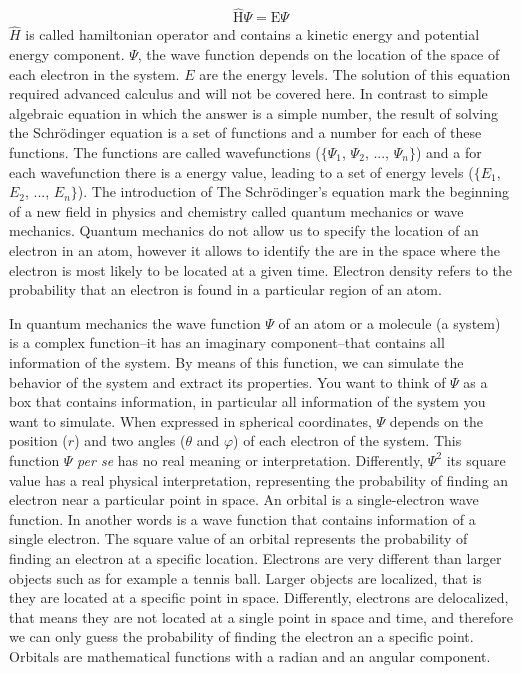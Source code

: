 \documentclass[main.tex]{subfiles}
\begin{document}
\begin{description}
\begin{equation*}
\begin{split}
\hat{\text{H}}\Psi=\text{E}\Psi
\end{split}\end{equation*}
$\hat{H}$ is called hamiltonian operator and contains a kinetic energy and potential energy component. $\Psi$, the wave function depends on the location of the space of each electron in the system. $E$ are the energy levels. The solution of this equation required advanced calculus and will not be covered here. In contrast to simple algebraic equation in which the answer is a simple number, the result of solving the Schr\"{o}dinger equation is a set of functions and a number for each of these functions. The functions are called wavefunctions ($\{\Psi_1$, $\Psi_2$, ..., $\Psi_n\}$) and a for each wavefunction there is a energy value, leading to a set of energy levels ($\{E_1$, $E_2$, ..., $E_n\}$).
The introduction of The Schr\"{o}dinger's equation mark the beginning of a new field in physics and chemistry called quantum mechanics or wave mechanics. Quantum mechanics do not allow us to specify the location of an electron in an atom, however it allows to identify the are in the space where the electron is most likely to be located at a given time. Electron density refers to the probability that an electron is found in a particular region of an atom.
\item[\docfilehook{The wave function: orbitals}{}] 
In quantum mechanics the wave function $\Psi$ of an atom or a molecule (a system) is a complex function--it has an imaginary component--that contains all information of the system. By means of this function, we can simulate the behavior of the system and extract its properties. You want to think of $\Psi$ as a box that contains information, in particular all information of the system you want to simulate. When expressed in spherical coordinates, $\Psi$ depends on the position ($r$) and two angles ($\theta$ and $\varphi$) of each electron of the system. This function $\Psi$ \emph{per se} has no real meaning or interpretation. Differently, $\Psi^2$
its square value has a real physical interpretation, representing the probability of finding an electron near a particular point in space. An orbital is a single-electron wave function. In another words is a wave function that contains information of a single electron. The square value of an orbital represents the probability of finding an electron at a specific location. Electrons are very different than larger objects such as for example a tennis ball. Larger objects are localized, that is they are located at a specific point in space. Differently, electrons are delocalized, that means they are not located at a single point in space and time, and therefore we can only guess the probability of finding the electron an a specific point. Orbitals are mathematical functions with a radian and an angular component.

\end{description}
\end{document}
